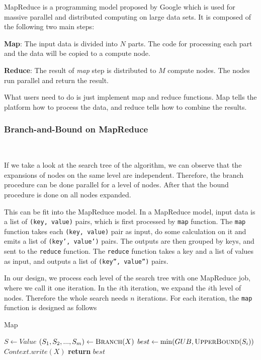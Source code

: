 \noindent MapReduce is a programming model proposed by Google which is used for massive parallel and distributed computing on large data sets. It is composed of the following two main steps:

\noindent \textbf{Map}: The input data is divided into $N$ parts. The code for processing each part and the data will be copied to a compute node.

\noindent \textbf{Reduce}: The result of \textit{map} step is distributed to $M$ compute nodes. The nodes run parallel and return the result.

What users need to do is just implement map and reduce functions. Map tells the platform how to process the data, and reduce tells how to combine the results.

\subsubsection{Branch-and-Bound on MapReduce}\

\noindent If we take a look at the search tree of the algorithm, we can observe that the expansions of nodes on the same level are independent. Therefore, the branch procedure can be done parallel for a level of nodes. After that the bound procedure is done on all nodes expanded.

This can be fit into the MapReduce model. In a MapReduce model, input data is a list of \texttt{(key, value)} pairs, which is first processed by \texttt{map} function. The \texttt{map} function takes each \texttt{(key, value)} pair as input, do some calculation on it and emits a list of \texttt{(key', value')} pairs. The outputs are then grouped by keys, and sent to the \texttt{reduce} function. The \texttt{reduce} function takes a key and a list of values as input, and outputs a list of \texttt{(key'', value'')} pairs.

In our design, we process each level of the search tree with one MapReduce job, where we call it one iteration. In the $i$th iteration, we expand the $i$th level of nodes. Therefore the whole search needs $n$ iterations. For each iteration, the \texttt{map} function is designed as follows
\begin{algorithm}
\caption{Map}
\begin{algorithmic}[1]
    \State $S \gets Value$
    \State $(S_1,S_2,...,S_m) \gets \textsc{Branch}(X)$
        \State $best \gets \min(GUB, \textsc{UpperBound}(S_i))$
    \EndFor
            \State $Context.write(X)$
        \EndIf
    \EndFor
    \State \textbf{return }$best$
\EndFunction
\end{algorithmic}
\end{algorithm}

